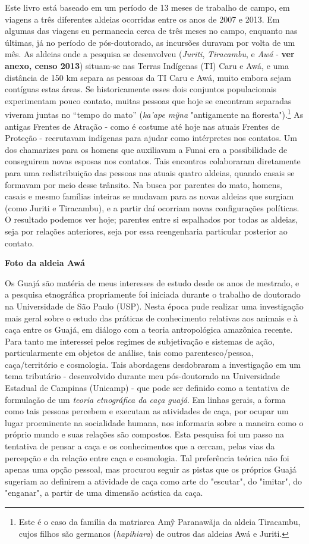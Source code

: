Este livro está baseado em um período de 13 meses de trabalho de campo,
em viagens a três diferentes aldeias ocorridas entre os anos de 2007 e
2013. Em algumas das viagens eu permanecia cerca de três meses no campo,
enquanto nas últimas, já no período de pós-doutorado, as incursões
duravam por volta de um mês. As aldeias onde a pesquisa se desenvolveu
(\emph{Juriti}, \emph{Tiracambu}, e \emph{Awá} - \textbf{ver anexo,
censo 2013}) situam-se nas Terras Indígenas (TI) Caru e Awá, e uma
distância de 150 km separa as pessoas da TI Caru e Awá, muito embora
sejam contíguas estas áreas. Se historicamente esses dois conjuntos
populacionais experimentam pouco contato, muitas pessoas que hoje se
encontram separadas viveram juntas no ``tempo do mato'' (\emph{ka'ape
mỹna} "antigamente na floresta").\footnote{Este é o caso da família da
  matriarca Amỹ Paranawãja da aldeia Tiracambu, cujos filhos são
  germanos (\emph{hapihiara}) de outros das aldeias Awá e Juriti.} As
antigas Frentes de Atração - como é costume até hoje nas atuais Frentes
de Proteção - recrutavam indígenas para ajudar como intérpretes nos
contatos. Um dos chamarizes para os homens que auxiliavam a Funai era a
possibilidade de conseguirem novas esposas nos contatos. Tais encontros
colaboraram diretamente para uma redistribuição das pessoas nas atuais
quatro aldeias, quando casais se formavam por meio desse trânsito. Na
busca por parentes do mato, homens, casais e mesmo famílias inteiras se
mudavam para as novas aldeias que surgiam (como Juriti e Tiracambu), e a
partir daí ocorriam novas configurações políticas. O resultado podemos
ver hoje; parentes entre si espalhados por todas as aldeias, seja por
relações anteriores, seja por essa reengenharia particular posterior ao
contato.

\textbf{Foto da aldeia Awá}

Os Guajá são matéria de meus interesses de estudo desde os anos de
mestrado, e a pesquisa etnográfica propriamente foi iniciada durante o
trabalho de doutorado na Universidade de São Paulo (USP). Nesta época
pude realizar uma investigação mais geral sobre o estudo das práticas de
conhecimento relativas aos animais e à caça entre os Guajá, em diálogo
com a teoria antropológica amazônica recente. Para tanto me interessei
pelos regimes de subjetivação e sistemas de ação, particularmente em
objetos de análise, tais como parentesco/pessoa, caça/território e
cosmologia. Tais abordagens desdobraram a investigação em um tema
tributário - desenvolvido durante meu pós-doutorado na Universidade
Estadual de Campinas (Unicamp) - que pode ser definido como a tentativa
de formulação de um \emph{teoria etnográfica da caça guajá}. Em linhas
gerais, a forma como tais pessoas percebem e executam as atividades de
caça, por ocupar um lugar proeminente na socialidade humana, nos
informaria sobre a maneira como o próprio mundo e suas relações são
compostos. Esta pesquisa foi um passo na tentativa de pensar a caça e os
conhecimentos que a cercam, pelas vias da percepção e da relação entre
caça e cosmologia. Tal preferência teórica não foi apenas uma opção
pessoal, mas procurou seguir as pistas que os próprios Guajá sugeriam ao
definirem a atividade de caça como arte do "escutar", do "imitar", do
"enganar", a partir de uma dimensão acústica da caça.

